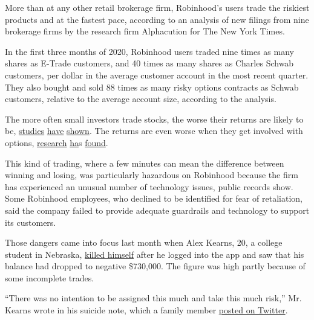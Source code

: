 More than at any other retail brokerage firm, Robinhood's users trade
the riskiest products and at the fastest pace, according to an analysis
of new filings from nine brokerage firms by the research firm
Alphacution for The New York Times.

In the first three months of 2020, Robinhood users traded nine times as
many shares as E-Trade customers, and 40 times as many shares as Charles
Schwab customers, per dollar in the average customer account in the most
recent quarter. They also bought and sold 88 times as many risky options
contracts as Schwab customers, relative to the average account size,
according to the analysis.

The more often small investors trade stocks, the worse their returns are
likely to be,
\href{https://www.sciencedirect.com/science/article/abs/pii/S1386418113000190}{studies}
\href{http://citeseerx.ist.psu.edu/viewdoc/download?doi=10.1.1.408.1468\&rep=rep1\&type=pdf}{have}
\href{https://www.sciencedirect.com/science/article/abs/pii/S1386418113000190}{shown}.
The returns are even worse when they get involved with options,
\href{https://www.nytimes3xbfgragh.onion/2013/05/25/business/growth-in-options-trading-helps-brokers-but-not-small-investors.html}{research}
\href{https://papers.ssrn.com/sol3/papers.cfm?abstract_id=965810}{ha}s
\href{https://www.sciencedirect.com/science/article/abs/pii/S0378426614003501}{found}.

This kind of trading, where a few minutes can mean the difference
between winning and losing, was particularly hazardous on Robinhood
because the firm has experienced an unusual number of technology issues,
public records show. Some Robinhood employees, who declined to be
identified for fear of retaliation, said the company failed to provide
adequate guardrails and technology to support its customers.

Those dangers came into focus last month when Alex Kearns, 20, a college
student in Nebraska,
\href{https://www.forbes.com/sites/sergeiklebnikov/2020/06/17/20-year-old-robinhood-customer-dies-by-suicide-after-seeing-a-730000-negative-balance/\#bbc1cfb16384}{killed
himself} after he logged into the app and saw that his balance had
dropped to negative \$730,000. The figure was high partly because of
some incomplete trades.

``There was no intention to be assigned this much and take this much
risk,'' Mr. Kearns wrote in his suicide note, which a family member
\href{https://twitter.com/BillBrewsterSCG/status/1273292130769932288?s=20}{posted
on Twitter}.

